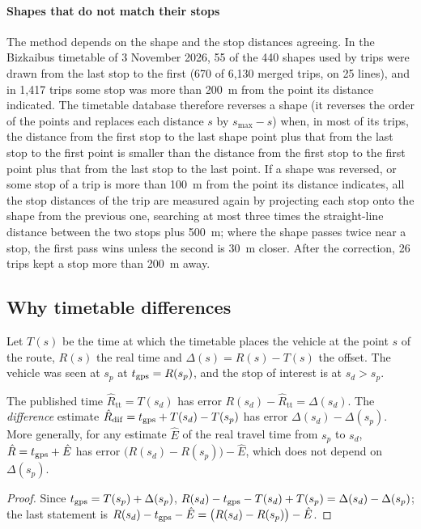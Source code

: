 \paragraph{Shapes that do not match their stops} The method depends on the shape and the stop distances agreeing. In
the Bizkaibus timetable of 3 November 2026, 55 of the 440 shapes used by trips were drawn from the last stop to the
first (670 of 6,130 merged trips, on 25 lines), and in 1,417 trips some stop was more than 200~m from the point its
distance indicated. The timetable database therefore reverses a shape (it reverses the order of the points and
replaces each distance $s$ by $s_{\max}-s$) when, in most of its trips, the distance from the first stop to the last
shape point plus that from the last stop to the first point is smaller than the distance from the first stop to the
first point plus that from the last stop to the last point. If a shape was reversed, or some stop of a trip is more
than 100~m from the point its distance indicates, all the stop distances of the trip are measured again by projecting
each stop onto the shape from the previous one, searching at most three times the straight-line distance between the
two stops plus 500~m; where the shape passes twice near a stop, the first pass wins unless the second is 30~m closer.
After the correction, 26 trips kept a stop more than 200~m away.

\subsection{Why timetable differences}
\label{sec:differences}

Let $T(s)$ be the time at which the timetable places the vehicle at the point $s$ of the route, $R(s)$ the real time
and $\Delta(s)=R(s)-T(s)$ the offset. The vehicle was seen at $s_p$ at $t_{\mathrm{gps}}=R(s_p)$, and the stop of interest is at
$s_d>s_p$.

\begin{proposition}
\label{prop:differences}
The published time $\hat R_{\mathrm{tt}}=T(s_d)$ has error $R(s_d)-\hat R_{\mathrm{tt}}=\Delta(s_d)$. The
\emph{difference} estimate $\hat R_{\mathrm{dif}}=t_{\mathrm{gps}}+T(s_d)-T(s_p)$ has error $\Delta(s_d)-\Delta(s_p)$. More
generally, for any estimate $\hat E$ of the real travel time from $s_p$ to $s_d$, $\hat R=t_{\mathrm{gps}}+\hat E$ has error
$\big(R(s_d)-R(s_p)\big)-\hat E$, which does not depend on $\Delta(s_p)$.
\end{proposition}
\begin{proof}
Since $t_{\mathrm{gps}}=T(s_p)+\Delta(s_p)$, $R(s_d)-t_{\mathrm{gps}}-T(s_d)+T(s_p)=\Delta(s_d)-\Delta(s_p)$; the last statement is
$R(s_d)-t_{\mathrm{gps}}-\hat E=\big(R(s_d)-R(s_p)\big)-\hat E$.
\end{proof}

